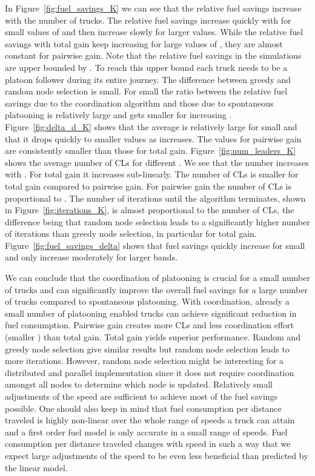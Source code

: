 \documentclass[letterpaper,10pt,conference,twocolumn]{IEEEtran}
\theoremstyle{definition}
\begin{document}
In Figure~\ref{fig:fuel_savings_K} we can see that the relative fuel savings increase with the number of trucks. The relative fuel savings increase quickly with  for small values of  and then increase slowly for larger values. While the relative fuel savings with total gain keep increasing for large values of , they are almost constant for pairwise gain. Note that the relative fuel savings in the simulations are upper bounded by . To reach this upper bound each truck needs to be a platoon follower during its entire journey. The difference between greedy and random node selection is small. For small  the ratio between the relative fuel savings due to the coordination algorithm and those due to spontaneous platooning is relatively large and gets smaller for increasing . Figure~\ref{fig:delta_d_K} shows that the average  is relatively large for small  and that it drops quickly to smaller values as  increases. The values for pairwise gain are consistently smaller than those for total gain. 
Figure~\ref{fig:num_leaders_K} shows the average number of CLs for different . We see that the number increases with . For total gain it increases sub-linearly. The number of CLs is smaller for total gain compared to pairwise gain. For pairwise gain the number of CLs is proportional to . The number of iterations until the algorithm terminates, shown in Figure~\ref{fig:iterations_K}, is almost proportional to the number of CLs, the difference being that random node selection leads to a significantly higher number of iterations than greedy node selection, in particular for total gain. 
Figure~\ref{fig:fuel_savings_delta} shows that fuel savings quickly increase for small  and only increase moderately for larger bands. 


We can conclude that the coordination of platooning is crucial for a small number of trucks and can significantly improve the overall fuel savings for a large number of trucks compared to spontaneous platooning. With coordination, already a small number of platooning enabled trucks can achieve significant reduction in fuel consumption. Pairwise gain creates more CLs and less coordination effort (smaller ) than total gain. Total gain yields superior performance. Random and greedy node selection give similar results but random node selection leads to more iterations. However, random node selection might be interesting for a distributed and parallel implementation since it does not require coordination amongst all nodes to determine which node is updated. 
Relatively small adjustments of the speed are sufficient to achieve most of the fuel savings possible. One should also keep in mind that fuel consumption per distance traveled is highly non-linear over the whole range of speeds a truck can attain and a first order fuel model is only accurate in a small range of speeds. 
Fuel consumption per distance traveled changes with speed in such a way that we expect large adjustments of the speed to be even less beneficial than predicted by the linear model.
\end{document}
